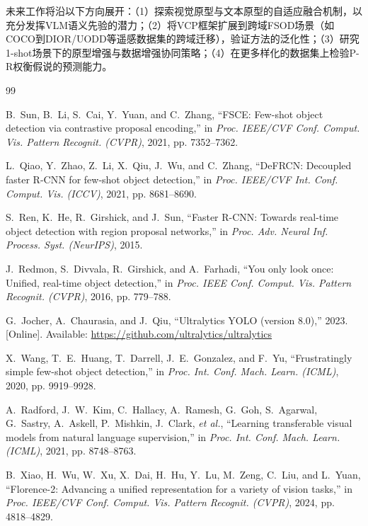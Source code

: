 \documentclass[zihao=5,a4paper,twocolumn]{ctexart}
\begin{document}
未来工作将沿以下方向展开：（1）探索视觉原型与文本原型的自适应融合机制，以充分发挥VLM语义先验的潜力；（2）将VCP框架扩展到跨域FSOD场景（如COCO到DIOR/UODD等遥感数据集的跨域迁移），验证方法的泛化性；（3）研究1-shot场景下的原型增强与数据增强协同策略；（4）在更多样化的数据集上检验P-R权衡假说的预测能力。


\clearpage

\begin{thebibliography}{99}
\songti

B.~Sun, B.~Li, S.~Cai, Y.~Yuan, and C.~Zhang,
``FSCE: Few-shot object detection via contrastive proposal encoding,''
in \emph{Proc. IEEE/CVF Conf. Comput. Vis. Pattern Recognit. (CVPR)}, 2021, pp. 7352--7362.

L.~Qiao, Y.~Zhao, Z.~Li, X.~Qiu, J.~Wu, and C.~Zhang,
``DeFRCN: Decoupled faster R-CNN for few-shot object detection,''
in \emph{Proc. IEEE/CVF Int. Conf. Comput. Vis. (ICCV)}, 2021, pp. 8681--8690.

S.~Ren, K.~He, R.~Girshick, and J.~Sun,
``Faster R-CNN: Towards real-time object detection with region proposal networks,''
in \emph{Proc. Adv. Neural Inf. Process. Syst. (NeurIPS)}, 2015.

J.~Redmon, S.~Divvala, R.~Girshick, and A.~Farhadi,
``You only look once: Unified, real-time object detection,''
in \emph{Proc. IEEE Conf. Comput. Vis. Pattern Recognit. (CVPR)}, 2016, pp. 779--788.

G.~Jocher, A.~Chaurasia, and J.~Qiu,
``Ultralytics YOLO (version 8.0),'' 2023. [Online]. Available: \url{https://github.com/ultralytics/ultralytics}

X.~Wang, T.~E.~Huang, T.~Darrell, J.~E.~Gonzalez, and F.~Yu,
``Frustratingly simple few-shot object detection,''
in \emph{Proc. Int. Conf. Mach. Learn. (ICML)}, 2020, pp. 9919--9928.

A.~Radford, J.~W.~Kim, C.~Hallacy, A.~Ramesh, G.~Goh, S.~Agarwal, G.~Sastry, A.~Askell, P.~Mishkin, J.~Clark, \emph{et al.},
``Learning transferable visual models from natural language supervision,''
in \emph{Proc. Int. Conf. Mach. Learn. (ICML)}, 2021, pp. 8748--8763.

B.~Xiao, H.~Wu, W.~Xu, X.~Dai, H.~Hu, Y.~Lu, M.~Zeng, C.~Liu, and L.~Yuan,
``Florence-2: Advancing a unified representation for a variety of vision tasks,''
in \emph{Proc. IEEE/CVF Conf. Comput. Vis. Pattern Recognit. (CVPR)}, 2024, pp. 4818--4829.


\end{thebibliography}
\end{document}
